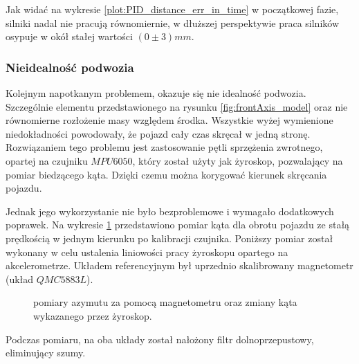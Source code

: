             Jak widać na wykresie \ref{plot:PID_distance_err_in_time} w początkowej fazie, silniki nadal nie pracują równomiernie, w dłuższej perspektywie praca silników osypuje w okół stałej wartości $(0 \pm 3)mm$.

    \subsubsection{Nieidealność podwozia}
        Kolejnym napotkanym problemem, okazuje się nie idealność podwozia.
        Szczególnie elementu przedstawionego na rysunku \ref{fig:frontAxis_model} oraz nie równomierne rozłożenie masy względem środka.
        Wszystkie wyżej wymienione niedokładności powodowały, że pojazd cały czas skręcał w jedną stronę.
        Rozwiązaniem tego problemu jest zastosowanie pętli sprzężenia zwrotnego, opartej na czujniku $MPU6050$, który został użyty jak żyroskop, pozwalający na pomiar biedzącego kąta.
        Dzięki czemu można korygować kierunek skręcania pojazdu.

        Jednak jego wykorzystanie nie było bezproblemowe i wymagało dodatkowych poprawek.
        Na wykresie \ref{plot:gyro_magneto_measure} przedstawiono pomiar kąta dla obrotu pojazdu ze stałą prędkością w jednym kierunku po kalibracji czujnika.
        Poniższy pomiar został wykonany w celu ustalenia liniowości pracy żyroskopu opartego na akcelerometrze.
        Układem referencyjnym był uprzednio skalibrowany magnetometr (układ $QMC5883L$).
%
        \begin{figure}[!ht]
            \centering
                \renewcommand{\figurename}{Wykres}
                \caption{pomiary azymutu za pomocą magnetometru oraz zmiany kąta wykazanego przez żyroskop.}
                \label{plot:gyro_magneto_measure}
        \end{figure}
        Podczas pomiaru, na oba układy został nałożony filtr dolnoprzepustowy, eliminujący szumy.

